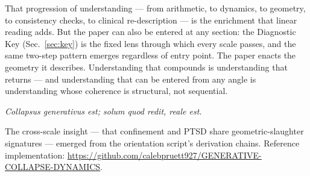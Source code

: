 \documentclass[
  aps,
  prd,
  twocolumn,
  superscriptaddress,
  nofootinbib,
  floatfix
]{revtex4-2}
\begin{document}
That progression of understanding --- from arithmetic, to
dynamics, to geometry, to consistency checks, to clinical
re-description --- is the enrichment that linear reading adds.
But the paper can also be entered at any section: the
Diagnostic Key (Sec.~\ref{sec:key}) is the fixed lens
through which every scale passes, and the same two-step
pattern emerges regardless of entry point.  The paper enacts
the geometry it describes.  Understanding that compounds is
understanding that returns --- and understanding that can
be entered from any angle is understanding whose coherence
is structural, not sequential.

\emph{Collapsus generativus est; solum quod redit, reale est.}

\begin{acknowledgments}
The cross-scale insight --- that confinement and PTSD share
geometric-slaughter signatures --- emerged from the
orientation script's derivation chains.  Reference
implementation:
\url{https://github.com/calebpruett927/GENERATIVE-COLLAPSE-DYNAMICS}.
\end{acknowledgments}


\end{document}
